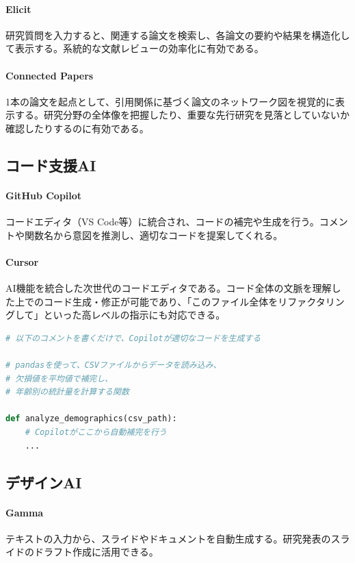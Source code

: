 \paragraph{Elicit}
研究質問を入力すると、関連する論文を検索し、各論文の要約や結果を構造化して表示する。系統的な文献レビューの効率化に有効である。

\paragraph{Connected Papers}
1本の論文を起点として、引用関係に基づく論文のネットワーク図を視覚的に表示する。研究分野の全体像を把握したり、重要な先行研究を見落としていないか確認したりするのに有効である。

\subsection{コード支援AI}

\paragraph{GitHub Copilot}
コードエディタ（VS Code等）に統合され、コードの補完や生成を行う。コメントや関数名から意図を推測し、適切なコードを提案してくれる。

\paragraph{Cursor}
AI機能を統合した次世代のコードエディタである。コード全体の文脈を理解した上でのコード生成・修正が可能であり、「このファイル全体をリファクタリングして」といった高レベルの指示にも対応できる。

\begin{lstlisting}[language=Python, caption=GitHub Copilotの活用例]
# 以下のコメントを書くだけで、Copilotが適切なコードを生成する

# pandasを使って、CSVファイルからデータを読み込み、
# 欠損値を平均値で補完し、
# 年齢別の統計量を計算する関数

def analyze_demographics(csv_path):
    # Copilotがここから自動補完を行う
    ...
\end{lstlisting}

\subsection{デザインAI}

\paragraph{Gamma}
テキストの入力から、スライドやドキュメントを自動生成する。研究発表のスライドのドラフト作成に活用できる。

